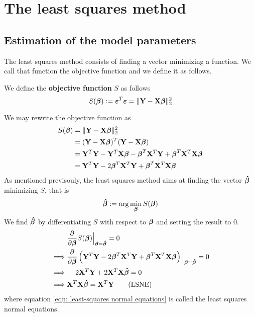\section{The least squares method}
\subsection{Estimation of the model parameters}

The least squares method consists of finding a vector minimizing a function. We call that function the objective function and we define it as follows.

\begin{definition}
    We define the \textbf{objective function} \( S \) as follows
    \begin{equation}
        \label{eqn: least squares objective function}
        S(\boldsymbol{\beta}) := \boldsymbol{\varepsilon}^{T} \boldsymbol{\varepsilon} = \| \mathbf{Y}-\mathbf{X} \boldsymbol{\beta} \|_2^2
    \end{equation}
\end{definition}
We may rewrite the objective function as
\begin{align*}
    S(\boldsymbol{\beta})
     & = \| \mathbf{Y}-\mathbf{X} \boldsymbol{\beta} \|_2^2                                          \\
     & = (\mathbf{Y} - \mathbf{X} \boldsymbol{\beta})^{T} (\mathbf{Y} - \mathbf{X} \boldsymbol{\beta})                             \\
     & = \mathbf{Y}^T \mathbf{Y} - \mathbf{Y}^T \mathbf{X} \boldsymbol{\beta} - \boldsymbol{\beta}^T \mathbf{X}^T \mathbf{Y} + \boldsymbol{\beta}^T \mathbf{X}^T \mathbf{X} \boldsymbol{\beta} \\
     & = \mathbf{Y}^T \mathbf{Y} - 2 \boldsymbol{\beta}^T \mathbf{X}^T \mathbf{Y} + \boldsymbol{\beta}^T \mathbf{X}^T \mathbf{X} \boldsymbol{\beta}              \\
\end{align*}
As mentioned previsouly, the least squares method aims at finding the vector $\boldsymbol{\hat{\beta}}$ minimizing \( S \), that is
\[
    \boldsymbol{\hat{\beta}} := \arg \min_{\boldsymbol{\beta}} S(\boldsymbol{\beta})
\]
We find \( \boldsymbol{\hat{\beta}} \) by differentiating \( S \) with respect to $\boldsymbol{\beta}$ and setting the result to 0.
\begin{align}
             & \frac{\partial}{\partial \boldsymbol{\beta}} S(\boldsymbol{\beta}) \Big|_{\boldsymbol{\beta} = \boldsymbol{\hat{\beta}}} = 0 \nonumber                                              \\
    \implies & \frac{\partial}{\partial \boldsymbol{\beta}} \left( \mathbf{Y}^T \mathbf{Y} - 2 \boldsymbol{\beta}^T \mathbf{X}^T \mathbf{Y} + \boldsymbol{\beta}^T \mathbf{X}^T \mathbf{X} \boldsymbol{\beta} \right)\Big|_{\boldsymbol{\beta} = \boldsymbol{\hat{\beta}}} = 0 \nonumber \\
    \implies & - 2 \mathbf{X}^T \mathbf{Y} + 2 \mathbf{X}^T \mathbf{X} \boldsymbol{\hat{\beta}} = 0 \nonumber                                                                            \\
    \implies & \mathbf{X}^T \mathbf{X} \boldsymbol{\hat{\beta}} = \mathbf{X}^T \mathbf{Y} \label{eqn: least-squares normal equations} \tag{LSNE}
\end{align}
where equation \eqref{eqn: least-squares normal equations} is called the least squares normal equations.


